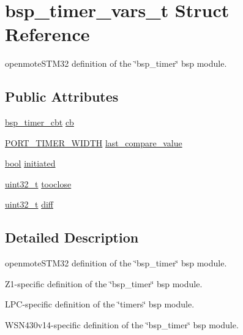 \hypertarget{structbsp__timer__vars__t}{}\section{bsp\+\_\+timer\+\_\+vars\+\_\+t Struct Reference}
\label{structbsp__timer__vars__t}


openmote\+S\+T\+M32 definition of the \char`\"{}bsp\+\_\+timer\char`\"{} bsp module.  


\subsection*{Public Attributes}
\begin{DoxyCompactItemize}
\item 
\hyperlink{openwsnmodule__obj_8h_a217f88f41d2d57897598ce4147c80419}{bsp\+\_\+timer\+\_\+cbt} \hyperlink{structbsp__timer__vars__t_a153fc3c53a86d984c22a4c28f3106eba}{cb}
\item 
\hyperlink{z1_2board__info_8h_abe66b9c1c60db84f2a99f2b827275f24}{P\+O\+R\+T\+\_\+\+T\+I\+M\+E\+R\+\_\+\+W\+I\+D\+TH} \hyperlink{structbsp__timer__vars__t_a0ccba2d6e2911bc8f69c22bf4a6d678c}{last\+\_\+compare\+\_\+value}
\item 
\hyperlink{_p_e___types_8h_a97a80ca1602ebf2303258971a2c938e2}{bool} \hyperlink{structbsp__timer__vars__t_a33729789e0dade517b8627d94e6e2e29}{initiated}
\item 
\hyperlink{_p_e___types_8h_a33594304e786b158f3fb30289278f5af}{uint32\+\_\+t} \hyperlink{structbsp__timer__vars__t_a70c4bae3d2bb518f2c1d106a51f44742}{tooclose}
\item 
\hyperlink{_p_e___types_8h_a33594304e786b158f3fb30289278f5af}{uint32\+\_\+t} \hyperlink{structbsp__timer__vars__t_a40c6ad2797c2d8c3140b0dd4e30fb95c}{diff}
\end{DoxyCompactItemize}


\subsection{Detailed Description}
openmote\+S\+T\+M32 definition of the \char`\"{}bsp\+\_\+timer\char`\"{} bsp module. 

Z1-\/specific definition of the \char`\"{}bsp\+\_\+timer\char`\"{} bsp module.

L\+P\+C-\/specific definition of the \char`\"{}timers\char`\"{} bsp module.

W\+S\+N430v14-\/specific definition of the \char`\"{}bsp\+\_\+timer\char`\"{} bsp module.

